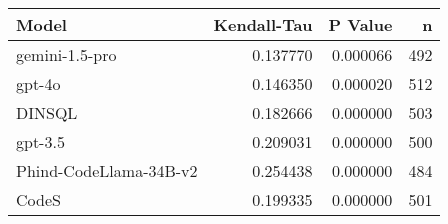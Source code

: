 \begin{tabular}{lrrr}
\toprule
Model & Kendall-Tau & P Value & n \\
\midrule
gemini-1.5-pro & 0.137770 & 0.000066 & 492 \\
gpt-4o & 0.146350 & 0.000020 & 512 \\
DINSQL & 0.182666 & 0.000000 & 503 \\
gpt-3.5 & 0.209031 & 0.000000 & 500 \\
Phind-CodeLlama-34B-v2 & 0.254438 & 0.000000 & 484 \\
CodeS & 0.199335 & 0.000000 & 501 \\
\bottomrule
\end{tabular}
